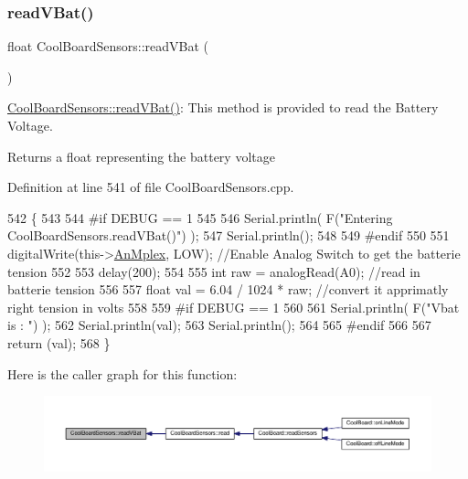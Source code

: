 \subsubsection{\texorpdfstring{read\+V\+Bat()}{readVBat()}}
{\footnotesize\ttfamily float Cool\+Board\+Sensors\+::read\+V\+Bat (\begin{DoxyParamCaption}{ }\end{DoxyParamCaption})}

\hyperlink{class_cool_board_sensors_a6944b6ea7bce8e2fce1b434acfd9d5f3}{Cool\+Board\+Sensors\+::read\+V\+Bat()}\+: This method is provided to read the Battery Voltage.

\begin{DoxyReturn}{Returns}
a float representing the battery voltage 
\end{DoxyReturn}


Definition at line 541 of file Cool\+Board\+Sensors.\+cpp.


\begin{DoxyCode}
542 \{
543 
544 \textcolor{preprocessor}{#if DEBUG == 1}
545 
546     Serial.println( F(\textcolor{stringliteral}{"Entering CoolBoardSensors.readVBat()"}) );
547     Serial.println();
548 
549 \textcolor{preprocessor}{#endif}
550 
551     digitalWrite(this->\hyperlink{class_cool_board_sensors_a12ef28b1046219e0aee10bf64e28c4a5}{AnMplex}, LOW);                            \textcolor{comment}{//Enable Analog Switch to get the
       batterie tension}
552     
553     delay(200);
554     
555     \textcolor{keywordtype}{int} raw = analogRead(A0);                                    \textcolor{comment}{//read in batterie tension}
556     
557     \textcolor{keywordtype}{float} val = 6.04 / 1024 * raw;                               \textcolor{comment}{//convert it apprimatly right tension in
       volts}
558     
559 \textcolor{preprocessor}{#if DEBUG == 1}
560 
561     Serial.println( F(\textcolor{stringliteral}{"Vbat is : "}) );
562     Serial.println(val);
563     Serial.println();
564 
565 \textcolor{preprocessor}{#endif}
566 
567     \textcolor{keywordflow}{return} (val);   
568 \}
\end{DoxyCode}
Here is the caller graph for this function\+:\nopagebreak
\begin{figure}[H]
\begin{center}
\leavevmode
\includegraphics[width=350pt]{de/d46/class_cool_board_sensors_a6944b6ea7bce8e2fce1b434acfd9d5f3_icgraph}
\end{center}
\end{figure}
\mbox{\label{class_cool_board_sensors_a406307ffd70272282d91479c7ed8d66f}} 
